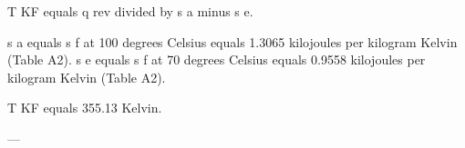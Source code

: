 T KF equals q rev divided by s a minus s e.  

s a equals s f at 100 degrees Celsius equals 1.3065 kilojoules per kilogram Kelvin (Table A2).  
s e equals s f at 70 degrees Celsius equals 0.9558 kilojoules per kilogram Kelvin (Table A2).  

T KF equals 355.13 Kelvin.  

---